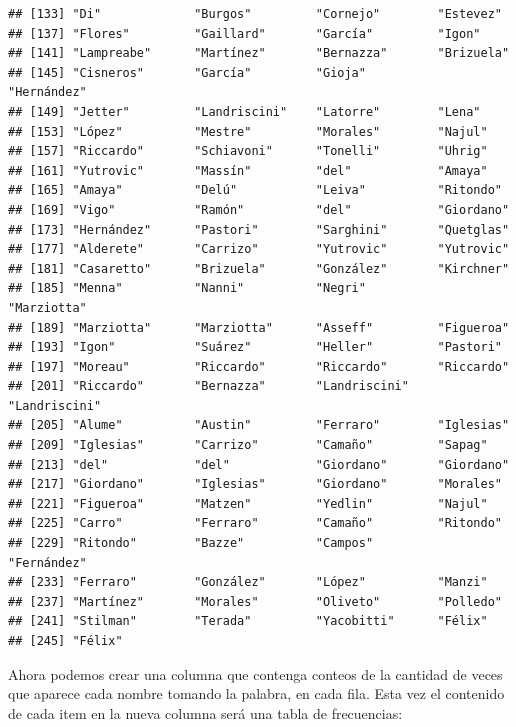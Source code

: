 \documentclass[
]{book}
\newenvironment{Shaded}{\begin{snugshade}}{\end{snugshade}}
\newcommand{\DecValTok}[1]{\textcolor[rgb]{0.00,0.00,0.81}{#1}}
\newcommand{\FunctionTok}[1]{\textcolor[rgb]{0.00,0.00,0.00}{#1}}
\newcommand{\NormalTok}[1]{#1}
\newcommand{\OtherTok}[1]{\textcolor[rgb]{0.56,0.35,0.01}{#1}}
\newcommand{\SpecialCharTok}[1]{\textcolor[rgb]{0.00,0.00,0.00}{#1}}
\begin{document}
\begin{verbatim}
## [133] "Di"             "Burgos"         "Cornejo"        "Estevez"       
## [137] "Flores"         "Gaillard"       "García"         "Igon"          
## [141] "Lampreabe"      "Martínez"       "Bernazza"       "Brizuela"      
## [145] "Cisneros"       "García"         "Gioja"          "Hernández"     
## [149] "Jetter"         "Landriscini"    "Latorre"        "Lena"          
## [153] "López"          "Mestre"         "Morales"        "Najul"         
## [157] "Riccardo"       "Schiavoni"      "Tonelli"        "Uhrig"         
## [161] "Yutrovic"       "Massín"         "del"            "Amaya"         
## [165] "Amaya"          "Delú"           "Leiva"          "Ritondo"       
## [169] "Vigo"           "Ramón"          "del"            "Giordano"      
## [173] "Hernández"      "Pastori"        "Sarghini"       "Quetglas"      
## [177] "Alderete"       "Carrizo"        "Yutrovic"       "Yutrovic"      
## [181] "Casaretto"      "Brizuela"       "González"       "Kirchner"      
## [185] "Menna"          "Nanni"          "Negri"          "Marziotta"     
## [189] "Marziotta"      "Marziotta"      "Asseff"         "Figueroa"      
## [193] "Igon"           "Suárez"         "Heller"         "Pastori"       
## [197] "Moreau"         "Riccardo"       "Riccardo"       "Riccardo"      
## [201] "Riccardo"       "Bernazza"       "Landriscini"    "Landriscini"   
## [205] "Alume"          "Austin"         "Ferraro"        "Iglesias"      
## [209] "Iglesias"       "Carrizo"        "Camaño"         "Sapag"         
## [213] "del"            "del"            "Giordano"       "Giordano"      
## [217] "Giordano"       "Iglesias"       "Giordano"       "Morales"       
## [221] "Figueroa"       "Matzen"         "Yedlin"         "Najul"         
## [225] "Carro"          "Ferraro"        "Camaño"         "Ritondo"       
## [229] "Ritondo"        "Bazze"          "Campos"         "Fernández"     
## [233] "Ferraro"        "González"       "López"          "Manzi"         
## [237] "Martínez"       "Morales"        "Oliveto"        "Polledo"       
## [241] "Stilman"        "Terada"         "Yacobitti"      "Félix"         
## [245] "Félix"
\end{verbatim}

Ahora podemos crear una columna que contenga conteos de la cantidad de veces que aparece cada nombre tomando la palabra, en cada fila. Esta vez el contenido de cada item en la nueva columna será una tabla de frecuencias:

\begin{Shaded}
\end{Shaded}
\end{document}
